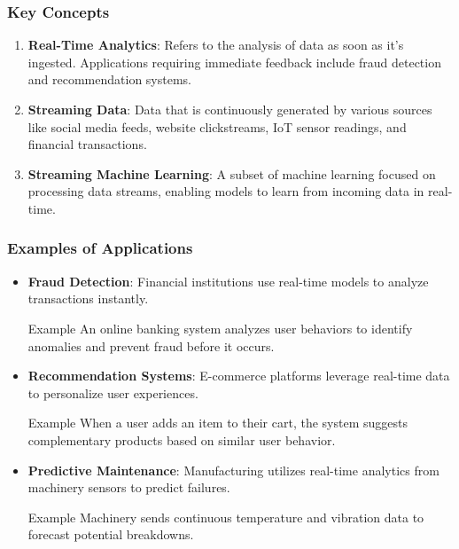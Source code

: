 \documentclass[aspectratio=169]{beamer}
\begin{document}
\begin{frame}[fragile]
    \frametitle{Key Concepts}
    \begin{enumerate}
        \item \textbf{Real-Time Analytics}: 
          Refers to the analysis of data as soon as it's ingested. Applications requiring immediate feedback include fraud detection and recommendation systems.
          
        \item \textbf{Streaming Data}: 
          Data that is continuously generated by various sources like social media feeds, website clickstreams, IoT sensor readings, and financial transactions.
          
        \item \textbf{Streaming Machine Learning}: 
          A subset of machine learning focused on processing data streams, enabling models to learn from incoming data in real-time.
    \end{enumerate}
\end{frame}

\begin{frame}[fragile]
    \frametitle{Examples of Applications}
    \begin{itemize}
        \item \textbf{Fraud Detection}: 
          Financial institutions use real-time models to analyze transactions instantly. 
          \begin{block}{Example}
              An online banking system analyzes user behaviors to identify anomalies and prevent fraud before it occurs.
          \end{block}
        
        \item \textbf{Recommendation Systems}: 
          E-commerce platforms leverage real-time data to personalize user experiences. 
          \begin{block}{Example}
              When a user adds an item to their cart, the system suggests complementary products based on similar user behavior.
          \end{block}
        
        \item \textbf{Predictive Maintenance}: 
          Manufacturing utilizes real-time analytics from machinery sensors to predict failures. 
          \begin{block}{Example}
              Machinery sends continuous temperature and vibration data to forecast potential breakdowns.
          \end{block}
    \end{itemize}
\end{frame}
\end{document}
